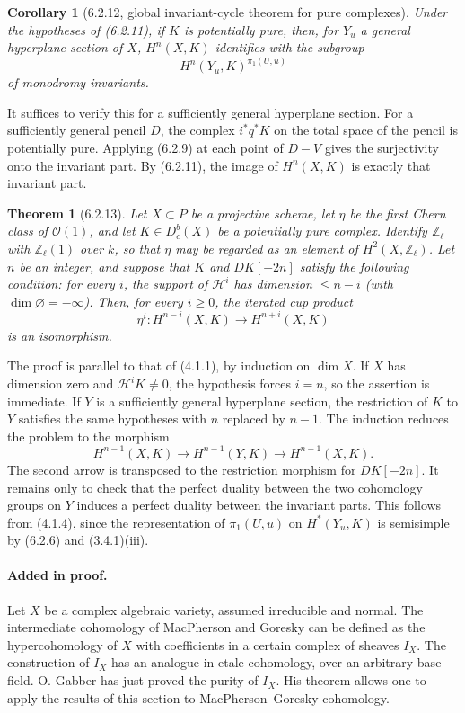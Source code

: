 \documentclass[11pt]{article}
\newtheorem{theorem}{Theorem}
\newtheorem{corollary}{Corollary}
\theoremstyle{remark}
\newcommand{\Zl}{\mathbb{Z}_\ell}
\begin{document}
\begin{corollary}[6.2.12, global invariant-cycle theorem for pure complexes]
Under the hypotheses of (6.2.11), if \(K\) is potentially pure, then, for \(Y_u\) a general hyperplane section of \(X\), \(H^n(X,K)\) identifies with the subgroup
\[
H^n(Y_u,K)^{\pi_1(U,u)}
\]
of monodromy invariants.
\end{corollary}

It suffices to verify this for a sufficiently general hyperplane section.  For a sufficiently general pencil \(D\), the complex \(i^*q^*K\) on the total space of the pencil is potentially pure.  Applying (6.2.9) at each point of \(D-V\) gives the surjectivity onto the invariant part.  By (6.2.11), the image of \(H^n(X,K)\) is exactly that invariant part.

\begin{theorem}[6.2.13]
Let \(X\subset P\) be a projective scheme, let \(\eta\) be the first Chern class of \(\mathcal O(1)\), and let \(K\in D^b_c(X)\) be a potentially pure complex.  Identify \(\Zl\) with \(\Zl(1)\) over \(k\), so that \(\eta\) may be regarded as an element of \(H^2(X,\Zl)\).  Let \(n\) be an integer, and suppose that \(K\) and \(DK[-2n]\) satisfy the following condition: for every \(i\), the support of \(\mathcal H^i\) has dimension \(\le n-i\) (with \(\dim\varnothing=-\infty\)).  Then, for every \(i\ge0\), the iterated cup product
\[
\eta^i:H^{n-i}(X,K)\longrightarrow H^{n+i}(X,K)
\]
is an isomorphism.
\end{theorem}

The proof is parallel to that of (4.1.1), by induction on \(\dim X\).  If \(X\) has dimension zero and \(\mathcal H^iK\ne0\), the hypothesis forces \(i=n\), so the assertion is immediate.  If \(Y\) is a sufficiently general hyperplane section, the restriction of \(K\) to \(Y\) satisfies the same hypotheses with \(n\) replaced by \(n-1\).  The induction reduces the problem to the morphism
\[
H^{n-1}(X,K)\longrightarrow H^{n-1}(Y,K)\longrightarrow H^{n+1}(X,K).
\]
The second arrow is transposed to the restriction morphism for \(DK[-2n]\).  It remains only to check that the perfect duality between the two cohomology groups on \(Y\) induces a perfect duality between the invariant parts.  This follows from (4.1.4), since the representation of \(\pi_1(U,u)\) on \(H^*(Y_u,K)\) is semisimple by (6.2.6) and (3.4.1)(iii).

\paragraph{Added in proof.}
Let \(X\) be a complex algebraic variety, assumed irreducible and normal.  The intermediate cohomology of MacPherson and Goresky can be defined as the hypercohomology of \(X\) with coefficients in a certain complex of sheaves \(I_X\).  The construction of \(I_X\) has an analogue in etale cohomology, over an arbitrary base field.  O. Gabber has just proved the purity of \(I_X\).  His theorem allows one to apply the results of this section to MacPherson--Goresky cohomology.
\end{document}
